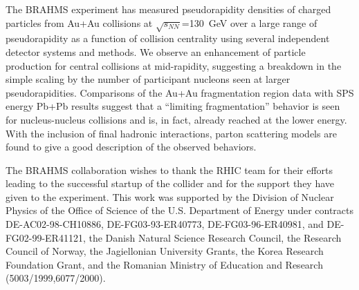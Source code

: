 \documentclass[singlespacing]{elsart}
\begin{document}
The BRAHMS experiment has measured pseudorapidity densities of 
charged particles from Au+Au collisions at $\sqrt{s_{NN}}$=130~GeV 
over a large range of pseudorapidity as a 
function of collision centrality using several independent detector 
systems and methods. 
We observe an enhancement of particle production for
central collisions at mid-rapidity, suggesting a breakdown in the simple
scaling by the number of participant nucleons seen at larger pseudorapidities.
Comparisons of the Au+Au fragmentation region data with SPS energy Pb+Pb
results suggest that a ``limiting fragmentation'' behavior 
is seen for nucleus-nucleus
collisions and is, in fact, already reached at the lower energy.
With the inclusion of final hadronic interactions, parton scattering
models are found to give a good description of the observed behaviors.

\ack
The BRAHMS collaboration wishes to thank the RHIC team for their
efforts leading to the successful startup of the collider and
for the support they have given to the experiment. 
This work was supported by the 
Division of Nuclear Physics
of the Office of Science of the U.S. Department of Energy under
contracts DE-AC02-98-CH10886, DE-FG03-93-ER40773, DE-FG03-96-ER40981, and
DE-FG02-99-ER41121, the Danish Natural Science Research Council, the 
Research Council of Norway, the Jagiellonian University Grants, 
the Korea Research Foundation Grant, and the Romanian Ministry of 
Education and Research (5003/1999,6077/2000).
 
\end{document}
